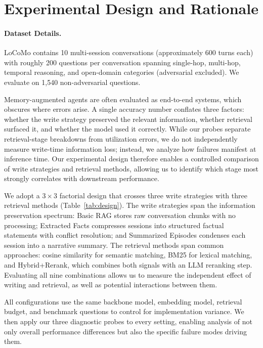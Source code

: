 \documentclass{article} %
\begin{document}
\section{Experimental Design and Rationale}
\label{app:experiment-design}

\paragraph{Dataset Details.}
LoCoMo contains 10 multi-session conversations (approximately 600 turns each) with roughly 200 questions per conversation spanning single-hop, multi-hop, temporal reasoning, and open-domain categories (adversarial excluded). We evaluate on 1,540 non-adversarial questions.

Memory-augmented agents are often evaluated as end-to-end systems, which obscures where errors arise. A single accuracy number conflates three factors: whether the write strategy preserved the relevant information, whether retrieval surfaced it, and whether the model used it correctly. While our probes separate retrieval-stage breakdowns from utilization errors, we do not independently measure write-time information loss; instead, we analyze how failures manifest at inference time. Our experimental design therefore enables a controlled comparison of write strategies and retrieval methods, allowing us to identify which stage most strongly correlates with downstream performance.

We adopt a $3 \times 3$ factorial design that crosses three write strategies with three retrieval methods (Table~\ref{tab:design}). The write strategies span the information preservation spectrum: Basic RAG stores raw conversation chunks with no processing; Extracted Facts compresses sessions into structured factual statements with conflict resolution; and Summarized Episodes condenses each session into a narrative summary. The retrieval methods span common approaches: cosine similarity for semantic matching, BM25 for lexical matching, and Hybrid+Rerank, which combines both signals with an LLM reranking step. Evaluating all nine combinations allows us to measure the independent effect of writing and retrieval, as well as potential interactions between them.

All configurations use the same backbone model, embedding model, retrieval budget, and benchmark questions to control for implementation variance. We then apply our three diagnostic probes to every setting, enabling analysis of not only overall performance differences but also the specific failure modes driving them.
\end{document}
